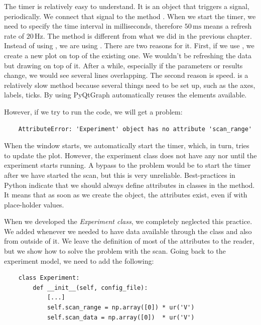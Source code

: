 The timer is relatively easy to understand. It is an object that triggers a signal,  periodically. We connect that signal to the method . When we start the timer, we need to specify the time interval in milliseconds, therefore $50\,\textrm{ms}$ means a refresh rate of $20\,\textrm{Hz}$. The  method is different from what we did in the previous chapter. Instead of using , we are using . There are two reasons for it. First, if we use , we create a new plot on top of the existing one. We wouldn't be refreshing the data but drawing on top of it. After a while, especially if the parameters or results change, we would see several lines overlapping. The second reason is speed.  is a relatively slow method because several things need to be set up, such as the axes, labels, ticks. By using  PyQtGraph automatically reuses the elements available.

However, if we try to run the code, we will get a problem:

\begin{verbatim}
    AttributeError: 'Experiment' object has no attribute 'scan_range'
\end{verbatim}


When the window starts, we automatically start the timer, which, in turn, tries to update the plot. However, the experiment class does not have any  nor  until the experiment starts running. A bypass to the problem would be to start the timer after we have started the scan, but this is very unreliable. Best-practices in Python indicate that we should always define attributes in classes in the  method. It means that as soon as we create the object, the attributes exist, even if with place-holder values.

When we developed the \emph{Experiment class}, we completely neglected this practice. We added  whenever we needed to have data available through the class and also from outside of it. We leave the definition of most of the attributes to the reader, but we show how to solve the problem with the scan. Going back to the experiment model, we need to add the following:

\begin{verbatim}
    class Experiment:
        def __init__(self, config_file):
            [...]
            self.scan_range = np.array([0]) * ur('V')
            self.scan_data = np.array([0])  * ur('V')
\end{verbatim}

